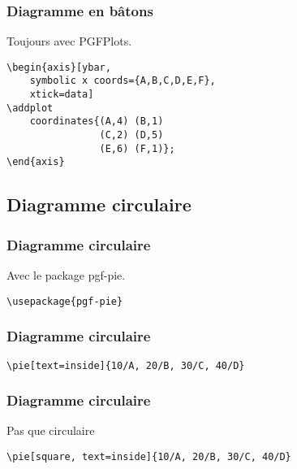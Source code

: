 \documentclass{clic_latex_beamer}
\begin{document}
\begin{frame}[fragile]
\frametitle{Diagramme en bâtons}
Toujours avec PGFPlots.
\begin{multicols}{2}


\columnbreak

\begin{lstlisting}
\begin{axis}[ybar,
    symbolic x coords={A,B,C,D,E,F},
    xtick=data]
\addplot
    coordinates{(A,4) (B,1)
                (C,2) (D,5)
                (E,6) (F,1)};
\end{axis}
\end{lstlisting}

\end{multicols}

\end{frame}

\subsection{Diagramme circulaire}
\begin{frame}[fragile]
\frametitle{Diagramme circulaire}
Avec le package pgf-pie.
\begin{lstlisting}
\usepackage{pgf-pie}
\end{lstlisting}
\end{frame}

\begin{frame}[fragile]
\frametitle{Diagramme circulaire}



\begin{lstlisting}
\pie[text=inside]{10/A, 20/B, 30/C, 40/D}
\end{lstlisting}

\end{frame}

\begin{frame}[fragile]
\frametitle{Diagramme circulaire}
Pas que circulaire



\begin{lstlisting}
\pie[square, text=inside]{10/A, 20/B, 30/C, 40/D}
\end{lstlisting}

\end{frame}
\end{document}
